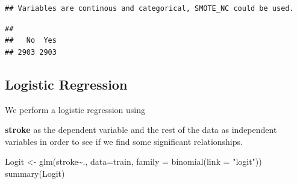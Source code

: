 \documentclass[
]{article}
\newenvironment{Shaded}{\begin{snugshade}}{\end{snugshade}}
\newcommand{\AttributeTok}[1]{\textcolor[rgb]{0.77,0.63,0.00}{#1}}
\newcommand{\CommentTok}[1]{\textcolor[rgb]{0.56,0.35,0.01}{\textit{#1}}}
\newcommand{\FunctionTok}[1]{\textcolor[rgb]{0.00,0.00,0.00}{#1}}
\newcommand{\NormalTok}[1]{#1}
\newcommand{\OtherTok}[1]{\textcolor[rgb]{0.56,0.35,0.01}{#1}}
\newcommand{\SpecialCharTok}[1]{\textcolor[rgb]{0.00,0.00,0.00}{#1}}
\newcommand{\StringTok}[1]{\textcolor[rgb]{0.31,0.60,0.02}{#1}}
\begin{document}
\begin{verbatim}
## Variables are continous and categorical, SMOTE_NC could be used.
\end{verbatim}

\begin{Shaded}
\end{Shaded}

\begin{verbatim}
## 
##   No  Yes 
## 2903 2903
\end{verbatim}

\subsection{Logistic Regression}

We perform a logistic regression using

\item

\textbf{stroke} as the dependent variable and the rest of the data as
independent variables in order to see if we find some significant
relationships.

\begin{Shaded}
\begin{Highlighting}[]
\NormalTok{Logit }\OtherTok{\textless{}{-}} \FunctionTok{glm}\NormalTok{(stroke}\SpecialCharTok{\textasciitilde{}}\NormalTok{., }\AttributeTok{data=}\NormalTok{train, }\AttributeTok{family =} \FunctionTok{binomial}\NormalTok{(}\AttributeTok{link =} \StringTok{"logit"}\NormalTok{))}
\FunctionTok{summary}\NormalTok{(Logit)}
\end{Highlighting}
\end{Shaded}
\end{document}
